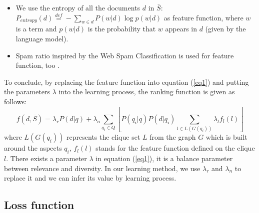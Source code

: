 \documentclass[review]{elsarticle}
\begin{document}
\begin{enumerate}
		\begin{itemize}
			\item We use the entropy of all the documents $d$ in $\bar{S}$: \\
$P_{entropy}(d)\overset{def}{=}-\sum_{w\in d}P(w|d)\log p(w|d)$ as feature function, where $w$ is a term and $p(w|d)$ is the probability that $w$ appears in $d$ (given by the language model).
			\item Spam ratio inspired by the Web Spam Classification is used for feature function, too \cite{fetterly2004spam}.
		\end{itemize}
\end{enumerate}


To conclude, by replacing the feature function into equation (\ref{eq1}) and putting the parameters $\lambda$ into the learning process, the ranking function is given as follows:
\begin{equation}
	f(d, \bar{S})=\lambda_rP(d|q)+\lambda_n\sum_{q_i\in Q}[P(q_i|q)P(d|q_i)\sum_{l\in L(G(q_i))}\lambda_lf_l(l)]
	\label{eq8}
\end{equation}
where $L(G(q_i))$ represents the clique set $L$ from the graph $G$ which is built around the aspects $q_i$, $f_l(l)$ stands for the feature function defined on the clique $l$. There exists a parameter $\lambda$ in equation (\ref{eq1}), it is a balance parameter between relevance and diversity. In our learning method, we use $\lambda_r$ and $\lambda_n$ to replace it and we can infer its value by learning process.



\subsection{Loss function}
%
%
\end{document}
